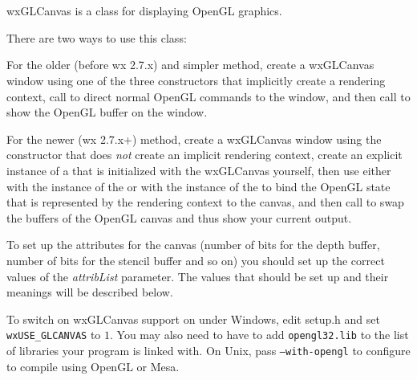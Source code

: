 \section{}\label{wxglcanvas}

wxGLCanvas is a class for displaying OpenGL graphics.

There are two ways to use this class:

For the older (before wx 2.7.x) and simpler method, create a wxGLCanvas window using one of the three
constructors that implicitly create a rendering context, call  
to direct normal OpenGL commands to the window, and then call  
to show the OpenGL buffer on the window.

For the newer (wx 2.7.x+) method, create a wxGLCanvas window using the constructor that does \emph{not} create an implicit rendering context,
create an explicit instance of a  that is initialized with the wxGLCanvas yourself,
then use either  with the instance of the 
or  with the instance of the 
to bind the OpenGL state that is represented by the rendering context to the canvas, and then call
 to swap the buffers of the OpenGL canvas and thus show your current output.

To set up the attributes for the canvas (number of bits for the depth buffer,
number of bits for the stencil buffer and so on) you should set up the correct values of
the {\it attribList} parameter. The values that should be set up and their meanings will be described below.

To switch on wxGLCanvas support on under Windows, edit setup.h and set
{\tt wxUSE\_GLCANVAS} to $1$. You may also need to have to add
{\tt opengl32.lib} to the list of libraries your program is linked with. On
Unix, pass {\tt --with-opengl} to configure to compile using OpenGL or Mesa.


\\
\\


